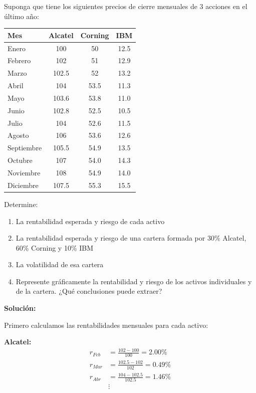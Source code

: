 \begin{ejemplo}
Suponga que tiene los siguientes precios de cierre mensuales de 3 acciones en el último año:

\begin{center}
\begin{tabular}{lccc}
\toprule
Mes & Alcatel & Corning & IBM \\
\midrule
Enero & 100 & 50 & 12.5 \\
Febrero & 102 & 51 & 12.9 \\
Marzo & 102.5 & 52 & 13.2 \\
Abril & 104 & 53.5 & 11.3 \\
Mayo & 103.6 & 53.8 & 11.0 \\
Junio & 102.8 & 52.5 & 10.5 \\
Julio & 104 & 52.6 & 11.5 \\
Agosto & 106 & 53.6 & 12.6 \\
Septiembre & 105.5 & 54.9 & 13.5 \\
Octubre & 107 & 54.0 & 14.3 \\
Noviembre & 108 & 54.9 & 14.0 \\
Diciembre & 107.5 & 55.3 & 15.5 \\
\bottomrule
\end{tabular}
\end{center}

Determine:
\begin{enumerate}
\item La rentabilidad esperada y riesgo de cada activo
\item La rentabilidad esperada y riesgo de una cartera formada por 30\% Alcatel, 60\% Corning y 10\% IBM
\item La volatilidad de esa cartera
\item Represente gráficamente la rentabilidad y riesgo de los activos individuales y de la cartera. ¿Qué conclusiones puede extraer?
\end{enumerate}

\textbf{Solución:}

Primero calculamos las rentabilidades mensuales para cada activo:

\textbf{Alcatel:}
\begin{align*}
r_{Feb} &= \frac{102-100}{100} = 2.00\% \\
r_{Mar} &= \frac{102.5-102}{102} = 0.49\% \\
r_{Abr} &= \frac{104-102.5}{102.5} = 1.46\% \\
&\vdots
\end{align*}


\end{ejemplo}
